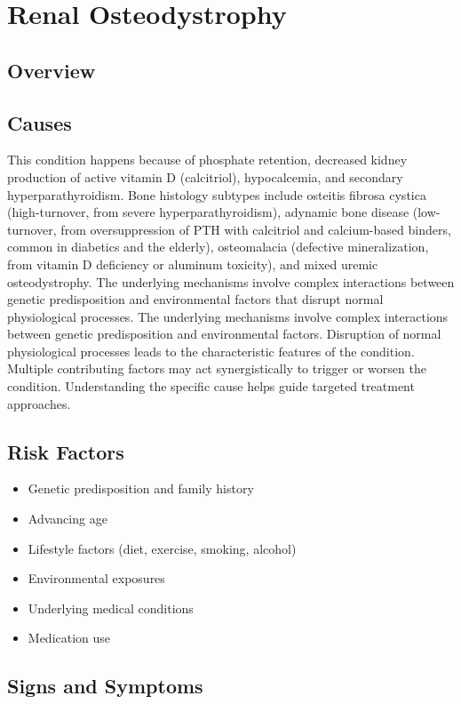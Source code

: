 \chapter{Renal Osteodystrophy}
\label{sec:Renal Osteodystrophy}

\section{Overview}

\section{Causes}
This condition happens because of phosphate retention, decreased kidney production of active vitamin D (calcitriol), hypocalcemia, and secondary hyperparathyroidism. Bone histology subtypes include osteitis fibrosa cystica (high-turnover, from severe hyperparathyroidism), adynamic bone disease (low-turnover, from oversuppression of PTH with calcitriol and calcium-based binders, common in diabetics and the elderly), osteomalacia (defective mineralization, from vitamin D deficiency or aluminum toxicity), and mixed uremic osteodystrophy. The underlying mechanisms involve complex interactions between genetic predisposition and environmental factors that disrupt normal physiological processes. The underlying mechanisms involve complex interactions between genetic predisposition and environmental factors. Disruption of normal physiological processes leads to the characteristic features of the condition. Multiple contributing factors may act synergistically to trigger or worsen the condition. Understanding the specific cause helps guide targeted treatment approaches.
\section{Risk Factors}


\begin{itemize}[noitemsep]
  \item Genetic predisposition and family history
  \item Advancing age
  \item Lifestyle factors (diet, exercise, smoking, alcohol)
  \item Environmental exposures
  \item Underlying medical conditions
  \item Medication use
\end{itemize}
\section{Signs and Symptoms}

